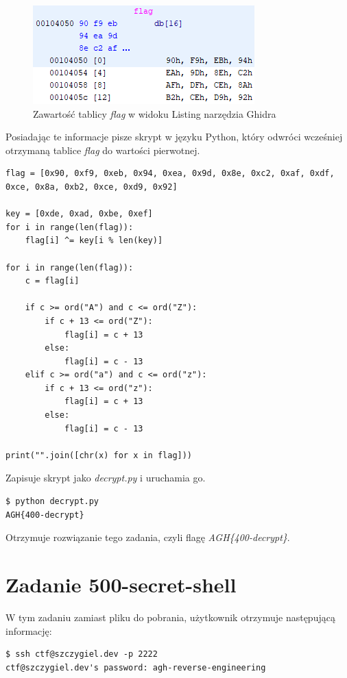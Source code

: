 \documentclass[language=polish,type=eng]{aghmodern}
\begin{document}
\begin{figure}[H]
\centering
\includegraphics{400_flag}
\caption{Zawartość tablicy \emph{flag} w widoku Listing narzędzia Ghidra}
\end{figure}

Posiadając te informacje pisze skrypt w języku Python, który odwróci wcześniej otrzymaną
tablice \emph{flag} do wartości pierwotnej.

\begin{verbatim}
flag = [0x90, 0xf9, 0xeb, 0x94, 0xea, 0x9d, 0x8e, 0xc2, 0xaf, 0xdf, 0xce, 0x8a, 0xb2, 0xce, 0xd9, 0x92]

key = [0xde, 0xad, 0xbe, 0xef]
for i in range(len(flag)):
    flag[i] ^= key[i % len(key)]

for i in range(len(flag)):
    c = flag[i]

    if c >= ord("A") and c <= ord("Z"):
        if c + 13 <= ord("Z"):
            flag[i] = c + 13
        else:
            flag[i] = c - 13
    elif c >= ord("a") and c <= ord("z"):
        if c + 13 <= ord("z"):
            flag[i] = c + 13
        else:
            flag[i] = c - 13

print("".join([chr(x) for x in flag]))
\end{verbatim}

Zapisuje skrypt jako \emph{decrypt.py} i uruchamia go.

\begin{verbatim}
$ python decrypt.py
AGH{400-decrypt}
\end{verbatim}

Otrzymuje rozwiązanie tego zadania, czyli flagę \emph{AGH\{400-decrypt\}}.

\section{Zadanie 500-secret-shell}

W tym zadaniu zamiast pliku do pobrania, użytkownik otrzymuje następującą informację:

\begin{verbatim}
$ ssh ctf@szczygiel.dev -p 2222
ctf@szczygiel.dev's password: agh-reverse-engineering
\end{verbatim}
\end{document}
